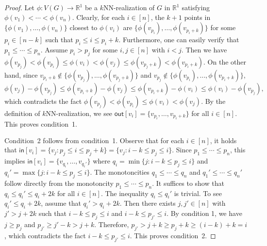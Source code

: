 \documentclass[11pt]{article}
\begin{document}
\begin{proof}
Let $\phi:V(G) \rightarrow \mathbb{R}^1$ be a $k$NN-realization of $G$ in $\mathbb{R}^1$ satisfying $\phi(v_1) < \cdots < \phi(v_n)$.
Clearly, for each $i \in [n]$, the $k+1$ points in $\{\phi(v_1),\dots,\phi(v_n)\}$ closest to $\phi(v_i)$ are $\{\phi(v_{p_i}),\dots,\phi(v_{p_i+k})\}$ for some $p_i \in [n-k]$ such that $p_i \leq i \leq p_i+k$.
Furthermore, one can easily verify that $p_1 \leq \cdots \leq p_n$.
Assume $p_i > p_j$ for some $i,j \in [n]$ with $i<j$.
Then we have $\phi(v_{p_j}) < \phi(v_{p_i}) \leq \phi(v_i) < \phi(v_j) \leq \phi(v_{p_j+k}) < \phi(v_{p_i+k})$.
On the other hand, since $v_{p_i+k} \notin \{\phi(v_{p_j}),\dots,\phi(v_{p_j+k})\}$ and $v_{p_j} \notin \{\phi(v_{p_i}),\dots,\phi(v_{p_i+k})\}$,
\begin{equation*}
    \phi(v_j) - \phi(v_{p_j}) \leq \phi(v_{p_i+k}) - \phi(v_j) \leq \phi(v_{p_i+k}) - \phi(v_i) \leq \phi(v_i) - \phi(v_{p_j}),
\end{equation*}
which contradicts the fact $\phi(v_{p_j}) < \phi(v_{p_i}) \leq \phi(v_i) < \phi(v_j)$.
By the definition of $k$NN-realization, we see $\mathsf{out}[v_i] = \{v_{p_i},\dots,v_{p_i+k}\}$ for all $i \in [n]$.
This proves condition~1.

Condition~2 follows from condition~1.
Observe that for each $i \in [n]$, it holds that $\mathsf{in}[v_i] = \{v_j: p_j \leq i \leq p_j+k \} = \{v_j: i-k \leq p_j \leq i\}$.
Since $p_1 \leq \cdots \leq p_n$, this implies $\mathsf{in}[v_i] = \{v_{q_i},\dots,v_{q_i'}\}$ where $q_i = \min\{j: i-k \leq p_j \leq i\}$ and $q_i' = \max\{j: i-k \leq p_j \leq i\}$.
The monotoncities $q_1 \leq \cdots \leq q_n$ and $q_1' \leq \cdots \leq q_n'$ follow directly from the monotoncity $p_1 \leq \cdots \leq p_n$.
It suffices to show that $q_i \leq q_i' \leq q_i+2k$ for all $i \in [n]$.
The inequality $q_i \leq q_i'$ is trivial.
To see $q_i' \leq q_i+2k$, assume that $q_i' > q_i+2k$.
Then there exists $j,j' \in [n]$ with $j' > j+2k$ such that $i-k \leq p_j \leq i$ and $i-k \leq p_{j'} \leq i$.
By condition 1, we have $j \geq p_j$ and $p_{j'} \geq j' - k > j+k$.
Therefore, $p_{j'} > j+k \geq p_j+k \geq (i-k)+k = i$, which contradicts the fact $i-k \leq p_{j'} \leq i$.
This proves condition~2.
\end{proof}
\end{document}
